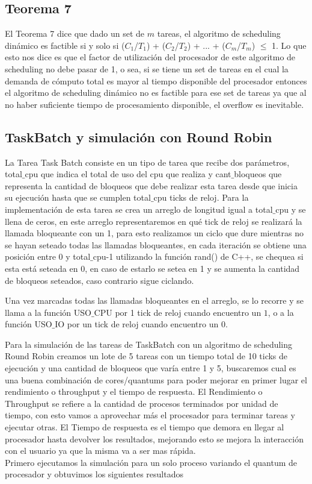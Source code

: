 \subsection{Teorema 7}
El Teorema 7 dice que dado un set de $m$ tareas, el algoritmo de scheduling dinámico es factible si y solo si ($C_1$/$T_1$) + ($C_2$/$T_2$) + ... + ($C_m$/$T_m$) $\le$ 1. Lo que esto nos dice es que el factor de utilización del procesador de este algoritmo de scheduling no debe pasar de 1, o sea, si se tiene un set de tareas en el cual la demanda de cómputo total es mayor al tiempo disponible del procesador entonces el algoritmo de scheduling dinámico no es factible para ese set de tareas ya que al no haber suficiente tiempo de procesamiento disponible, el overflow es inevitable.


\subsection{TaskBatch y simulación con Round Robin}
La Tarea Task Batch consiste en un tipo de tarea que recibe dos parámetros, total$\_$cpu que indica el total de uso del cpu que realiza y cant$\_$bloqueos que representa la cantidad de bloqueos que debe realizar esta tarea desde que inicia su ejecución hasta que se cumplen total$\_$cpu ticks de reloj. Para la implementación de esta tarea se crea un arreglo de longitud igual a total$\_$cpu y se llena de ceros, en este arreglo representaremos en qué tick de reloj se realizará la llamada bloqueante con un 1, para esto realizamos un ciclo que dure mientras no se hayan seteado todas las llamadas bloqueantes, en cada iteración se obtiene una posición entre 0 y total$\_$cpu-1 utilizando la función rand() de C++, se chequea si esta está seteada en 0, en caso de estarlo se setea en 1 y se aumenta la cantidad de bloqueos seteados, caso contrario sigue ciclando.

Una vez marcadas todas las llamadas bloqueantes en el arreglo, se lo recorre y se llama a la función USO$\_$CPU por 1 tick de reloj cuando encuentro un $1$, o a la función USO$\_$IO por un tick de reloj cuando encuentro un $0$.

Para la simulación de las tareas de TaskBatch con un algoritmo de scheduling Round Robin creamos un lote de 5 tareas con un tiempo total de 10 ticks de ejecución y una cantidad de bloqueos que varía entre 1 y 5, buscaremos cual es una buena combinación de cores/quantums para poder mejorar en primer lugar el rendimiento o throughput y el tiempo de respuesta.
El Rendimiento o Throughput se refiere a la cantidad de procesos terminados por unidad de tiempo, con esto vamos a aprovechar más el procesador para terminar tareas y ejecutar otras.
El Tiempo de respuesta es el tiempo que demora en llegar al procesador hasta devolver los resultados, mejorando esto se mejora la interacción con el usuario ya que la misma va a ser mas rápida.\\
Primero ejecutamos la simulación para un solo proceso variando el quantum de procesador y obtuvimos los siguientes resultados


